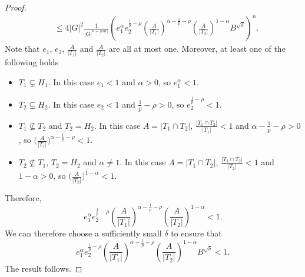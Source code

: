 \documentclass[10pt,a4paper]{amsart}
\newcommand{\abs}[1]{\vert#1\vert}
\newcommand{\ceil}[1]{\lceil#1\rceil}
\begin{document}
\begin{proof}
\begin{align*}
&\leq 4\abs{G}^2
\frac{1}{\abs{G}^{n+\ceil{\alpha n}}}
\left(
e_1^{\alpha} e_2^{\frac{1}{p}-\rho}
\left(\frac{A}{\abs{T_1}}\right)^{\alpha-\frac{1}{p}-\rho}
\left(\frac{A}{\abs{T_2}}\right)^{1-\alpha}
B^{\sqrt{\delta}}
\right)^n.
\end{align*}
Note that $e_1$, $e_2$, $\frac{A}{\abs{T_1}}$ and $\frac{A}{\abs{T_2}}$ are all at most one. Moreover, at least one of the following holds
\begin{itemize}
    \item $T_1\subsetneq H_1$.
    In this case $e_1<1$ and $\alpha>0$, so $e_1^\alpha<1$.
    \item $T_2\subsetneq H_2$.
    In this case $e_2<1$ and $\frac{1}{p}-\rho>0$, so $e_2^{\frac{1}{p}-\rho}<1$.
    \item $T_1\not\subseteq T_2$ and $T_2=H_2$.
    In this case $A=\abs{T_1\cap T_2}$,
    $\frac{\abs{T_1\cap T_2}}{\abs{T_1}}<1$ and $\alpha-\frac{1}{p}-\rho>0$, so $\Big(\frac{A}{\abs{T_1}}\Big)^{\alpha-\frac{1}{p}-\rho}<1$.
    \item $T_2\not\subseteq T_1$, $T_2=H_2$ and $\alpha\neq 1$.
    In this case $A=\abs{T_1\cap T_2}$, $\frac{\abs{T_1\cap T_2}}{\abs{T_2}}<1$ and $1-\alpha>0$, so $\Big(\frac{A}{\abs{T_2}}\Big)^{1-\alpha}<1$.
\end{itemize}
Therefore,
\[
e_1^{\alpha} e_2^{\frac{1}{p}-\rho}
\left(\frac{A}{\abs{T_1}}\right)^{\alpha-\frac{1}{p}-\rho}
\left(\frac{A}{\abs{T_2}}\right)^{1-\alpha}<1.
\]
We can therefore choose a sufficiently small $\delta$ to ensure that
\[
e_1^{\alpha} e_2^{\frac{1}{p}-\rho}
\left(\frac{A}{\abs{T_1}}\right)^{\alpha-\frac{1}{p}-\rho}
\left(\frac{A}{\abs{T_2}}\right)^{1-\alpha}
B^{\sqrt{\delta}}
<1.
\]
The result follows.
\end{proof}
\end{document}
